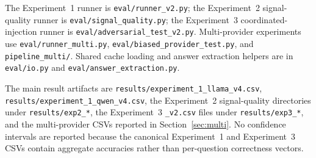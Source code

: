 \documentclass[11pt]{article}
\begin{document}
The Experiment~1 runner is \texttt{eval/runner\_v2.py}; the Experiment~2
signal-quality runner is \texttt{eval/signal\_quality.py}; the Experiment~3
coordinated-injection runner is \texttt{eval/adversarial\_test\_v2.py}.
Multi-provider experiments use \texttt{eval/runner\_multi.py},
\texttt{eval/biased\_provider\_test.py}, and \texttt{pipeline\_multi/}. Shared
cache loading and answer extraction helpers are in \texttt{eval/io.py} and
\texttt{eval/answer\_extraction.py}.

The main result artifacts are \texttt{results/experiment\_1\_llama\_v4.csv},
\texttt{results/experiment\_1\_qwen\_v4.csv}, the Experiment~2 signal-quality
directories under \texttt{results/exp2\_*}, the Experiment~3 \texttt{\_v2.csv}
files under \texttt{results/exp3\_*}, and the multi-provider CSVs reported in
Section~\ref{sec:multi}. No confidence intervals are reported because the
canonical Experiment~1 and Experiment~3 CSVs contain aggregate accuracies rather
than per-question correctness vectors.
\end{document}
